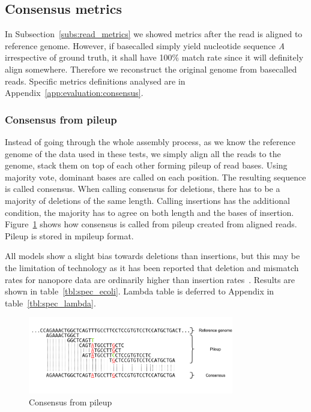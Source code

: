 \documentclass[runningheads,a4paper]{llncs}
\begin{document}
\subsection{Consensus metrics}

In Subsection~\ref{subs:read_metrics} we showed metrics after the read is aligned to reference genome. However, if basecalled simply yield nucleotide sequence \emph{A} irrespective of ground truth, it shall have 100\% match rate since it will definitely align somewhere. Therefore we reconstruct the original genome from basecalled reads. Specific metrics definitions analysed are in Appendix~\ref{app:evaluation:consensus}.

\subsubsection{Consensus from pileup}

Instead of going through the whole assembly process, as we know the reference genome of the data used in these tests, we simply align all the reads to the genome, stack them on top of each other forming pileup of read bases. Using majority vote, dominant bases are called on each position. The resulting sequence is called consensus. When calling consensus for deletions,  there has to be a majority of deletions of the same length. Calling insertions has the additional condition, the majority has to agree on both length and the bases of insertion. Figure~\ref{fg:consensus} shows how consensus is called from pileup created from aligned reads. Pileup is stored in mpileup format.

All models show a slight bias towards deletions than insertions, but this may be the limitation of technology as it has been reported that deletion and mismatch rates for nanopore data are ordinarily higher than insertion rates~\cite{sovic2016fast}. Results are shown in table~\ref{tbl:spec_ecoli}. Lambda table is deferred to Appendix in table~\ref{tbl:spec_lambda}.

\begin{figure}[]
   \begin{center}
       \includegraphics[width=0.8\textwidth]{./imgs/consnesus.png}
       \caption{Consensus from pileup}
       \label{fg:consensus}
   \end{center}
\end{figure}
\end{document}
